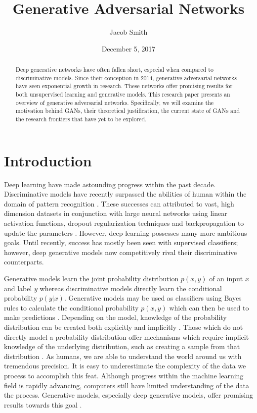 \documentclass[11pt]{article}
\title{Generative Adversarial Networks}
\author{Jacob Smith}
\date{December 5, 2017}
\begin{document}
\maketitle

\begin{abstract}
    Deep generative networks have often fallen short, especial when compared to discriminative models. Since their conception in 2014, generative adversarial networks have seen exponential growth in research. These networks offer promising results for both unsupervised learning and generative models. This research paper presents an overview of generative adversarial networks. Specifically, we will examine the motivation behind GANs, their theoretical justification, the current state of GANs and the research frontiers that have yet to be explored.
\end{abstract}

\section{Introduction}
Deep learning have made astounding progress within the past decade. Discriminative models have recently surpassed the abilities of human within the domain of pattern recognition \citep{2014arXiv1404.7828S}. These successes can attributed to vast, high dimension datasets in conjunction with large neural networks using linear activation functions, dropout regularization techniques and backpropagation to update the parameters \citep{2014arXiv1406.2661G}. However, deep learning possesses many more ambitious goals. Until recently, success has mostly been seen with supervised classifiers; however, deep generative models now competitively rival their discriminative counterparts.

Generative models learn the joint probability distribution $p(x,y)$ of an input $x$ and label $y$ whereas discriminative models directly learn the conditional probability $p(y|x)$. Generative models may be used as classifiers using Bayes rules to calculate the conditional probability $p(x,y)$ which can then be used to make predictions \citep{NIPS2001_2020}. Depending on the model, knowledge of the probability distribution can be created both explicitly and implicitly \citep{Goodfellow-et-al-2016}. Those which do not directly model a probability distribution offer mechanisms which require implicit knowledge of the underlying distribution, such as creating a sample from that distribution \citep{Goodfellow-et-al-2016}. As humans, we are able to understand the world around us with tremendous precision. It is easy to underestimate the complexity of the data we process to accomplish this feat. Although progress within the machine learning field is rapidly advancing, computers still have limited understanding of the data the process. Generative models, especially deep generative models, offer promising results towards this goal \citep{genmodelingopenai}.
\end{document}
